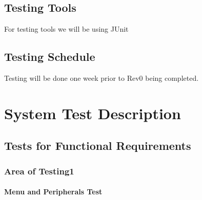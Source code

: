 \documentclass[12pt, titlepage]{article}
\begin{document}
\subsection{Testing Tools}
For testing tools we will be using JUnit

\subsection{Testing Schedule}
Testing will be done one week prior to Rev0 being completed.

\section{System Test Description}
	
\subsection{Tests for Functional Requirements}

\subsubsection{Area of Testing1}
		
\paragraph{Menu and Peripherals Test}
\end{document}
